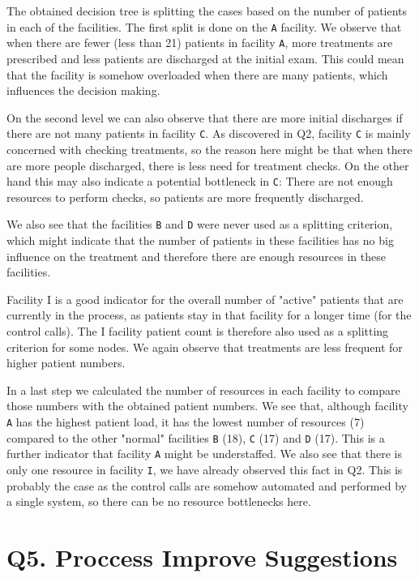 \documentclass[12pt]{report}
\begin{document}
The obtained decision tree is splitting the cases based on the number of patients in each of the facilities. The first split is done on the \texttt{A} facility. We observe that when there are fewer (less than 21) patients in facility \texttt{A}, more treatments are prescribed and less patients are discharged at the initial exam. This could mean that the facility is somehow overloaded when there are many patients, which influences the decision making. 

On the second level we can also observe that there are more initial discharges if there are not many patients in facility \texttt{C}. As discovered in Q2, facility \texttt{C} is mainly concerned with checking treatments, so the reason here might be that when there are more people discharged, there is less need for treatment checks. On the other hand this may also indicate a potential bottleneck in \texttt{C}: There are not enough resources to perform checks, so patients are more frequently discharged.

We also see that the facilities \texttt{B} and \texttt{D} were never used as a splitting criterion, which might indicate that the number of patients in these facilities has no big influence on the treatment and therefore there are enough resources in these facilities.

Facility I is a good indicator for the overall number of "active" patients that are currently in the process, as patients stay in that facility for a longer time (for the control calls). The I facility patient count is therefore also used as a splitting criterion for some nodes. We again observe that treatments are less frequent for higher patient numbers.

In a last step we calculated the number of resources in each facility to compare those numbers with the obtained patient numbers. We see that, although facility \texttt{A} has the highest patient load, it has the lowest number of resources (7) compared to the other "normal" facilities \texttt{B} (18), \texttt{C} (17) and \texttt{D} (17). This is a further indicator that facility \texttt{A} might be understaffed. We also see that there is only one resource in facility \texttt{I}, we have already observed this fact in Q2. This is probably the case as the control calls are somehow automated and performed by a single system, so there can be no resource bottlenecks here.

\section{Q5. Proccess Improve Suggestions}
\end{document}
